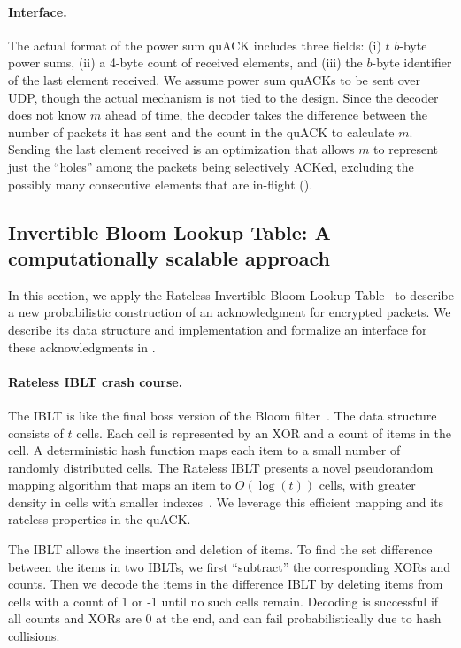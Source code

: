 \paragraph{Interface.}

The actual format of the power sum quACK includes three fields: (i) $t$ $b$-byte
power sums, (ii) a 4-byte count of received elements, and (iii) the $b$-byte
identifier of the last element received. We assume power sum quACKs to be sent
over UDP, though the actual mechanism is not tied to the design.
Since the decoder
does not know $m$ ahead of time, the decoder takes the difference between the
number of packets it has sent and the count in the quACK to calculate $m$.
Sending the last element received is an optimization that allows $m$ to
represent just the ``holes'' among the packets being selectively ACKed,
excluding the possibly many consecutive elements that are in-flight
().

\subsection{Invertible Bloom Lookup Table: A computationally scalable approach}
\label{sec:quack:constructions:iblt}


In this section, we apply
the Rateless Invertible Bloom Lookup Table~\cite{yang2024practical}
to describe a new probabilistic construction of an acknowledgment
for encrypted packets. We describe its data structure and implementation
and formalize an interface for these acknowledgments in .

\paragraph{Rateless IBLT crash course.} The IBLT is like the final boss version
 of the Bloom filter~\cite{goodrich2011invertible}. The data structure consists of $t$ cells. Each
 cell is represented by an XOR and a count of items in the cell. A
 deterministic hash function maps each item to a small number of randomly
 distributed cells. The Rateless IBLT presents a novel pseudorandom mapping
 algorithm that maps an item to $O(\log(t))$ cells, with greater density in
 cells with smaller indexes~\cite{yang2024practical}. We leverage this
 efficient mapping and its rateless properties in the quACK.

The IBLT allows the insertion and deletion of items. To find the set difference
between the items in two IBLTs, we first ``subtract'' the corresponding XORs
and counts. Then we decode the items in the difference IBLT by deleting items
from cells with a count of 1 or -1 until no such cells remain. Decoding is
successful if all counts and XORs are 0 at the end, and can fail
probabilistically due to hash collisions.


